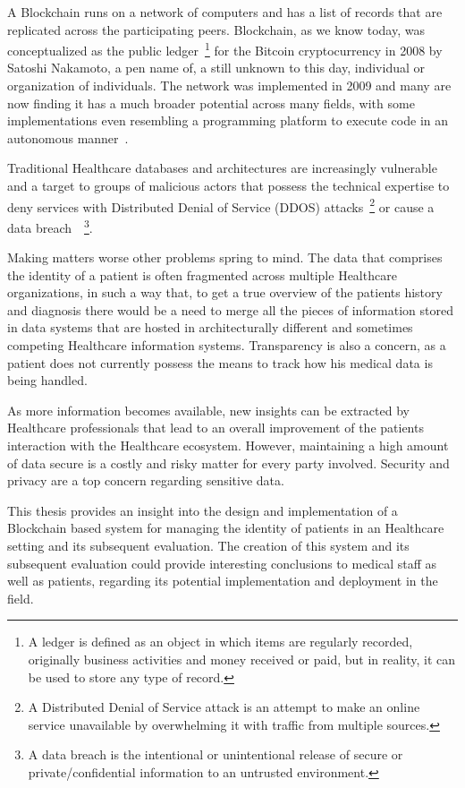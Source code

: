 A Blockchain runs on a network of computers and has a list of records that are
replicated across the participating peers. Blockchain, as we know today, was
conceptualized as the public ledger~\footnote{A ledger is defined as an object
in which items are regularly recorded, originally business activities and money
received or paid, but in reality, it can be used to store any type of record.}
for the Bitcoin cryptocurrency in 2008 by Satoshi Nakamoto, a pen name of, a
still unknown to this day, individual or organization of individuals. The
network was implemented in 2009 and many are now finding it has a much broader
potential across many fields, with some implementations even resembling a
programming platform to execute code in an autonomous
manner~\cite{Nakamoto2008}.

Traditional Healthcare databases and architectures are increasingly vulnerable
and a target to groups of malicious actors that possess the technical expertise
to deny services with Distributed Denial of Service (DDOS) attacks~\footnote{A
Distributed Denial of Service attack is an attempt to make an online service
unavailable by overwhelming it with traffic from multiple sources.} or cause a
data breach~\cite{mcCoy2018}~\footnote{A data breach is the intentional or
unintentional release of secure or private/confidential information to an
untrusted environment.}. 

Making matters worse other problems spring to mind. The data that comprises the
identity of a patient is often fragmented across multiple Healthcare
organizations, in such a way that, to get a true overview of the patients
history and diagnosis there would be a need to merge all the pieces of
information stored in data systems that are hosted in architecturally different
and sometimes competing Healthcare information systems. Transparency is also a
concern, as a patient does not currently possess the means to track how his
medical data is being handled.

As more information becomes available, new insights can be extracted by
Healthcare professionals that lead to an overall improvement of the patients
interaction with the Healthcare ecosystem. However, maintaining a high amount
of data secure is a costly and risky matter for every party involved. Security
and privacy are a top concern regarding sensitive data. 

This thesis provides an insight into the design and implementation of a
Blockchain based system for managing the identity of patients in an Healthcare
setting and its subsequent evaluation. The creation of this system and its
subsequent evaluation could provide interesting conclusions to medical staff as
well as patients, regarding its potential implementation and deployment in the
field.

